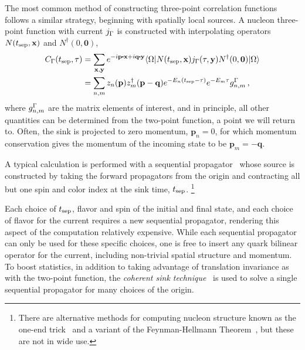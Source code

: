 The most common method of constructing three-point correlation functions follows a similar strategy, beginning with spatially local sources.
A nucleon three-point function with current $j_\Gamma$ is constructed with interpolating operators $N(t_{\rm sep},\mathbf{x})$ and $N^\dagger(0,\mathbf{0})$,
\begin{align}
C_\G(\tsep,\t) &= \sum_{\mathbf{x,y}}e^{-i\mathbf{p\dotp x} +i\mathbf{q\dotp y}}
    \langle\O|N(\tsep,\mathbf{x}) j_\G(\t,\mathbf{y}) N^\dagger(0,\mathbf{0}) |\O\rangle
\nonumber\\&=
    \sum_{n,m} z_n(\mathbf{p})z_m^\dagger(\mathbf{p-q})e^{-E_n(\tsep-\t)}e^{-E_m \t} g_{n,m}^\G\, ,
\end{align}
where $g_{n,m}^\Gamma$ are the matrix elements of interest, and in principle, all other quantities can be determined from the two-point function, a point we will return to.
Often, the sink is projected to zero momentum, $\mathbf{p}_n=0$, for which momentum conservation gives the momentum of the incoming state to be $\mathbf{p}_m = -\mathbf{q}$.%
\begin{marginnote}
\end{marginnote}%
A typical calculation is performed with a sequential propagator~\cite{Martinelli:1988rr}
whose source is constructed by taking the forward propagators from the origin and contracting all but one spin and color index at the sink time, $t_{\rm sep}$.%
\footnote{There are alternative methods for computing nucleon structure known as the one-end trick~\cite{Foster:1998vw,McNeile:2006bz,Alexandrou:2013xon} and a variant of the Feynman-Hellmann Theorem~\cite{CSSM:2014uyt}, but these are not in wide use.}

Each choice of $t_{\rm sep}$, flavor and spin of the initial and final state, and each choice of flavor for the current requires a new sequential propagator, rendering this aspect of the computation relatively expensive.
While each sequential propagator can only be used for these specific choices, one is free to insert any quark bilinear operator for the current, including non-trivial spatial structure and momentum.
To boost statistics, in addition to taking advantage of translation invariance as with the two-point function, the \textit{coherent sink technique}~\cite{LHPC:2010jcs} is used to solve a single sequential propagator for many choices of the origin.

